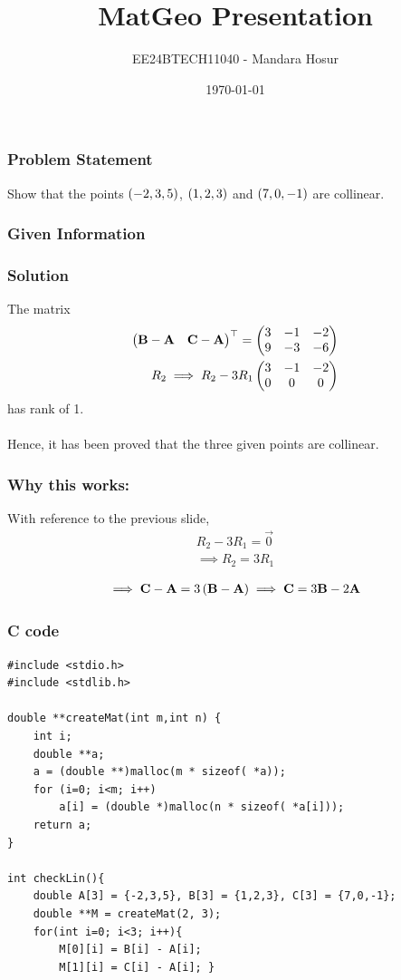 \documentclass{beamer}
\begin{document}
\title{MatGeo Presentation}
\author{EE24BTECH11040 - Mandara Hosur}
\date{\today} 

\begin{frame}
\titlepage
\end{frame}

\begin{frame}
\frametitle{Problem Statement}
Show that the points $\left(-2,3,5\right)$, $\left(1,2,3\right)$ and $\left(7,0,-1\right)$ are collinear.
\end{frame}

\begin{frame}
\frametitle{Given Information}
\begin{table}[h!]    
  \centering
  
  \label{Table 1}
\end{table}
\end{frame}

\begin{frame}
\frametitle{Solution}
The matrix 
\begin{align}
\begin{pmatrix}\mathbf{B}-\mathbf{A} & \mathbf{C}-\mathbf{A}\end{pmatrix}^\top = \begin{pmatrix}3 & -1 & -2 \\ 
                                                        9 & -3 & -6\end{pmatrix} \\
      {R_2 \implies R_2 - 3R_1} 
	 \begin{pmatrix}3 & -1 & -2 \\ 0 & 0 & 0\end{pmatrix}
\end{align}
has rank of 1. \\ \\
Hence, it has been proved that the three given points are collinear. 
\end{frame}

\begin{frame}
\frametitle{Why this works:}
With reference to the previous slide, \\
\begin{align*}
R_2 - 3R_1 = \vec{0} \\
\implies R_2 = 3R_1 \\
\end{align*}
\begin{align*}
\implies \mathbf{C} - \mathbf{A} = 3\left(\mathbf{B} - \mathbf{A}\right)
\implies \mathbf{C} = 3\mathbf{B} - 2\mathbf{A}
\end{align*}
\end{frame}

\begin{frame}[fragile]
\frametitle{C code}
\begin{verbatim}
#include <stdio.h>
#include <stdlib.h>

double **createMat(int m,int n) {
	int i;
	double **a;
	a = (double **)malloc(m * sizeof( *a));
	for (i=0; i<m; i++)
		a[i] = (double *)malloc(n * sizeof( *a[i]));
	return a;
}

int checkLin(){
	double A[3] = {-2,3,5}, B[3] = {1,2,3}, C[3] = {7,0,-1};
	double **M = createMat(2, 3);
	for(int i=0; i<3; i++){
		M[0][i] = B[i] - A[i];
		M[1][i] = C[i] - A[i]; }
\end{verbatim}
\end{frame}
\end{document}
